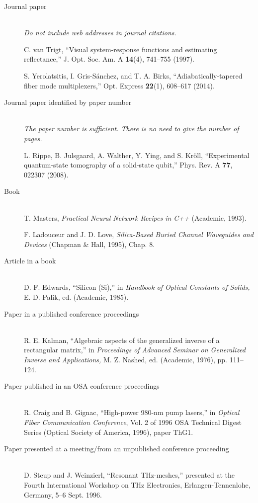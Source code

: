 \documentclass[10pt,letterpaper]{article}
\begin{document}
\begin{description}
\item[Journal paper] \hfill\\
{\it Do not include web addresses in journal citations.}

C. van Trigt, ``Visual system-response functions and estimating reflectance,'' %
   J. Opt. Soc. Am. A {\bf 14}(4), 741--755 (1997).

S. Yerolatsitis, I. Gris-S\'anchez, and T. A. Birks,
``Adiabatically-tapered fiber mode multiplexers,'' Opt. Express {\bf 22}(1), 608--617 (2014).

\item[Journal paper identified by paper number] \hfill\\
{\it The paper number is sufficient. There is no need to give the number of pages.}

L. Rippe, B. Julsgaard, A. Walther, Y. Ying, and S. Kr\"oll,
``Experimental quantum-state tomography of a solid-state qubit,'' Phys. Rev. A {\bf 77}, 022307 (2008).

\item[Book] \hfill\\
T. Masters, {\it Practical Neural Network Recipes in C++} (Academic, 1993).

F. Ladouceur and J. D. Love, \textit{Silica-Based Buried Channel Waveguides and Devices} (Chapman \& Hall, 1995), Chap. 8.

\item[Article in a book] \hfill\\
D. F. Edwards, ``Silicon (Si),'' in {\it Handbook of Optical Constants of Solids,} E. D. Palik, ed. (Academic, 1985).

\item[Paper in a published conference proceedings] \hfill\\
R. E. Kalman, ``Algebraic aspects of the generalized inverse of a
rectangular matrix,'' in {\it Proceedings of Advanced Seminar on
Generalized Inverse and Applications,} M. Z. Nashed, ed. (Academic, 1976), pp. 111--124.

\item[Paper published in an OSA conference proceedings] \hfill\\
R. Craig and B. Gignac, ``High-power 980-nm pump lasers,'' in
{\it Optical Fiber Communication Conference}, Vol. 2 of 1996 OSA Technical Digest Series
(Optical Society of America, 1996), paper ThG1.

\item[Paper presented at a meeting/from an unpublished conference proceeding] \hfill\\
D. Steup and J. Weinzierl, ``Resonant THz-meshes,'' presented at the
Fourth International Workshop on THz Electronics,
Erlangen-Tennenlohe, Germany, 5--6 Sept. 1996.


\end{description}
\end{document}
